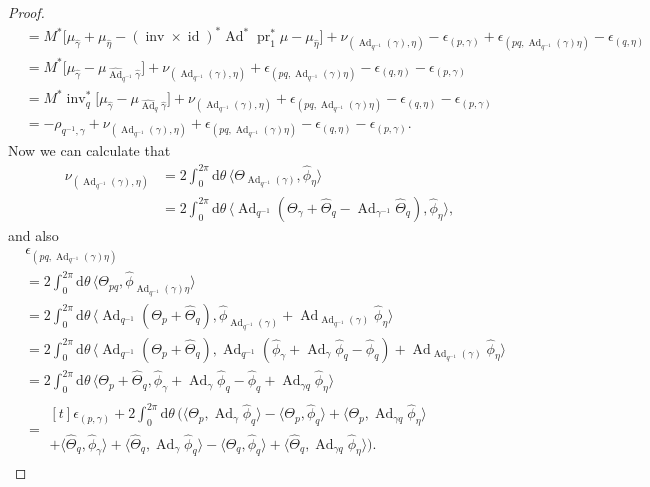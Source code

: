 \documentclass[12pt]{amsart}
\DeclareMathOperator{\id}{id}
\DeclareMathOperator{\Ad}{Ad}
\DeclareMathOperator{\pr}{pr}
\theoremstyle{plain}
\theoremstyle{definition}
\theoremstyle{remark}
\numberwithin{equation}{section}
\newcommand{\<}{\langle}
\renewcommand{\>}{\rangle}
\newcommand{\intSone}{\int_{0}^{2\pi}\mathrm{d}\theta\,}
\newcommand{\Thetahat}{\widehat{\Theta}}
\newcommand{\phihat}{\widehat{\phi}}
\DeclareMathOperator{\inv}{inv}
\begin{document}
\begin{proof}
\begin{align*}
  & = M^*\big[\mu_{\hat\gamma} + \mu_{\hat\eta} - (\inv\times \id)^*\Ad^*\pr_1^*\mu - \mu_{\hat\eta}\big] + \nu_{(\Ad_{q^{-1}}(\gamma),\eta)}- \epsilon_{(p,\gamma)} + \epsilon_{(pq,\Ad_{q^{-1}}(\gamma)\eta)} - \epsilon_{(q,\eta)}\\
  & = M^*\big[\mu_{\hat\gamma} - \mu_{\widehat{\Ad}_{q^{-1}}\hat\gamma}\big]+ \nu_{(\Ad_{q^{-1}}(\gamma),\eta)}  + \epsilon_{(pq,\Ad_{q^{-1}}(\gamma)\eta)} - \epsilon_{(q,\eta)}- \epsilon_{(p,\gamma)}\\
  & = M^*\inv_q^*\big[\mu_{\hat\gamma} - \mu_{\widehat{\Ad}_q\hat\gamma}\big]+ \nu_{(\Ad_{q^{-1}}(\gamma),\eta)}  + \epsilon_{(pq,\Ad_{q^{-1}}(\gamma)\eta)} - \epsilon_{(q,\eta)}- \epsilon_{(p,\gamma)}\\
  & = -\rho_{q^{-1},\gamma} + \nu_{(\Ad_{q^{-1}}(\gamma),\eta)}  + \epsilon_{(pq,\Ad_{q^{-1}}(\gamma)\eta)} - \epsilon_{(q,\eta)}- \epsilon_{(p,\gamma)}.
\end{align*}
Now we can calculate that
\begin{align*}
  \nu_{(\Ad_{q^{-1}}(\gamma),\eta)}
  & = 2 \intSone \langle\Theta_{\Ad_{q^{-1}}(\gamma)}, \phihat_\eta\rangle\\
  & = 2 \intSone \langle \Ad_{q^{-1}}(\Theta_\gamma +\Thetahat_q - \Ad_{\gamma^{-1}}\Thetahat_q),\phihat_\eta\rangle,
\end{align*}
and also
\begin{align*}
  &\epsilon_{(pq,\Ad_{q^{-1}}(\gamma)\eta)} \\
  & = 2 \intSone \langle \Theta_{pq},\phihat_{\Ad_{q^{-1}}(\gamma)\eta}\rangle\\
  & = 2 \intSone \langle \Ad_{q^{-1}}(\Theta_p + \Thetahat_q ),
    \phihat_{\Ad_{q^{-1}}(\gamma)} + \Ad_{\Ad_{q^{-1}}(\gamma)}\phihat_\eta
      \rangle\\
  & = 2 \intSone \langle \Ad_{q^{-1}}(\Theta_p + \Thetahat_q),
    \Ad_{q^{-1}}(\phihat_\gamma + \Ad_\gamma \phihat_q-\phihat_q)
    + \Ad_{\Ad_{q^{-1}}(\gamma)}\phihat_\eta
     \rangle\\
  & = 2 \intSone \langle \Theta_p + \Thetahat_q,
    \phihat_\gamma + \Ad_\gamma \phihat_q-\phihat_q + \Ad_{\gamma q}\phihat_\eta
     \rangle\\
  & = \begin{multlined}[t]
    \epsilon_{(p,\gamma)} + 2 \intSone \Big(\langle
         \Theta_p, \Ad_\gamma\phihat_q\rangle - \langle \Theta_p,\phihat_q\rangle + \langle \Theta_p,\Ad_{\gamma q}\phihat_\eta\rangle \\
        + \langle\Thetahat_q, \phihat_\gamma\rangle + \langle\Thetahat_q ,\Ad_\gamma\phihat_q \rangle - \langle\Thetahat_q,\phihat_q\rangle + \langle\Thetahat_q,\Ad_{\gamma q}\phihat_\eta\rangle\Big).

\end{multlined}
\end{align*}
\end{proof}
\end{document}
